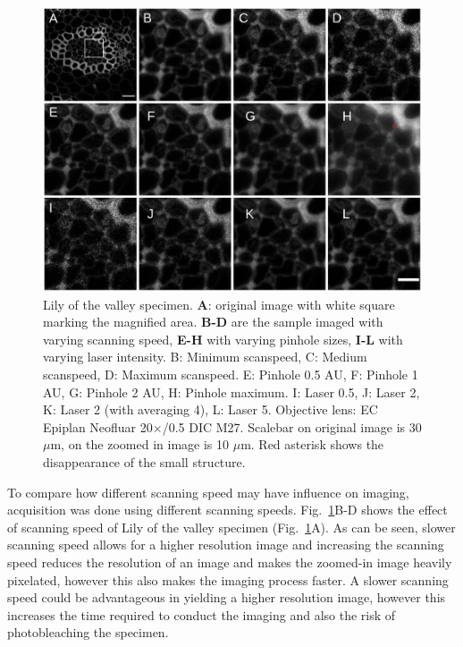 \begin{figure}[h!]
\centering
\includegraphics[width=\columnwidth]{Exp_3_LSM/Figures/Bcr/LSMmergedv2}	
\caption[different scanspeed]{Lily of the valley specimen. \textbf{A}: original image with white square marking the magnified area. 
\textbf{B-D} are the sample imaged with varying scanning speed, \textbf{E-H} with varying pinhole sizes, \textbf{I-L} with varying laser intensity. 
B: Minimum scanspeed, C: Medium scanspeed, D: Maximum scanspeed. 
E: Pinhole 0.5 AU, F: Pinhole 1 AU, G: Pinhole 2 AU, H: Pinhole maximum. 
I: Laser 0.5, J: Laser 2, K: Laser 2 (with averaging 4), L: Laser 5. 
Objective lens: EC Epiplan Neofluar 20$\times$/0.5 DIC M27. 
Scalebar on original image is 30 $\mu$m, on the zoomed in image is 10 $\mu$m. 
Red asterisk shows the disappearance of the small structure.} 
\label{fig:LSMmerged}
\end{figure}

To compare how different scanning speed may have influence on imaging, acquisition was done using different scanning speeds. 
Fig.~\ref{fig:LSMmerged}B-D shows the effect of scanning speed of Lily of the valley specimen (Fig.~\ref{fig:LSMmerged}A). 
As can be seen, slower scanning speed allows for a higher resolution image and increasing the scanning speed reduces the resolution of an image and makes the zoomed-in image heavily pixelated, however this also makes the imaging process faster. 
A slower scanning speed could be advantageous in yielding a higher resolution image, however this increases the time required to conduct the imaging and also the risk of photobleaching the specimen. 

